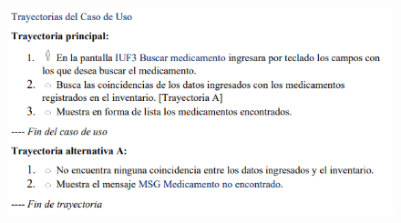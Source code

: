 \documentclass[12pt,letterpaper]{article}
\begin{document}
            \begin{figure}[H]
                \centering
                \includegraphics [scale=0.9]{specs/trayBuscarMedicamento}
            \end{figure}
\end{document}
